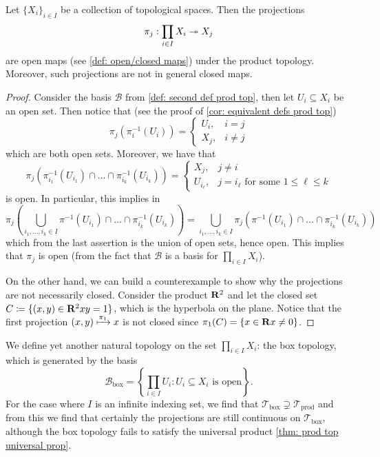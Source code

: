 \begin{lemma}
  Let \(\{X_i\}_{i \in I} \) be a collection of topological spaces. Then the
  projections
  \[
    \pi_j: \prod_{i \in I} X_i \twoheadrightarrow X_j
  \]
  are open maps (see \cref{def: open/closed maps}) under the product
  topology. Moreover, such projections are not in general closed maps.
\end{lemma}

\begin{proof}
  Consider the basis \(\mathcal B\) from \cref{def: second def prod top}, then
  let \(U_i \subseteq X_i\) be an open set. Then notice that (see the proof of
  \cref{cor: equivalent defs prod top})
  \[
    \pi_j(\pi_i^{-1}(U_i)) =
    \begin{cases}
      U_i, &i = j \\
      X_j, &i \neq j
    \end{cases}
  \]
  which are both open sets. Moreover, we have that
  \[
    \pi_j \left(\pi_{i_1}^{-1}(U_{i_1}) \cap \dots \cap \pi_{i_k}^{-1}(U_{i_k})
    \right) =
    \begin{cases}
      X_j,        & j \neq i \\
      U_{i_\ell}, & j = i_\ell \text{ for some } 1 \leq \ell \leq k
    \end{cases}
  \]
  is open. In particular, this implies in
  \[
    \pi_j \left( \bigcup_{i_1, \dots, i_k \in I} \pi^{-1}(U_{i_1}) \cap \dots
    \cap \pi_{i_k}^{-1}(U_{i_k}) \right)
    =
    \bigcup_{i_1, \dots, i_k \in I} \pi_j \left( \pi^{-1}(U_{i_1}) \cap \dots
    \cap \pi_{i_k}^{-1}(U_{i_k}) \right)
  \]
  which from the last assertion is the union of open sets, hence open. This
  implies that \(\pi_j\) is open (from the fact that \(\mathcal B\) is a basis
  for \(\prod_{i \in I} X_i\)).

  On the other hand, we can build a counterexample to show why the projections
  are not necessarily closed. Consider the product \(\mathbf{R}^2\) and let the
  closed set \(C \coloneq \{(x, y) \in \mathbf{R}^2 \relax x y = 1\}\), which is the
  hyperbola on the plane. Notice that the first projection \((x, y)
  \xmapsto{\pi_1} x\) is not closed since \(\pi_1(C) = \{x \in \mathbf{R} \relax x
  \neq 0\}\).
\end{proof}

\begin{definition}
  We define yet another natural topology on the set \(\prod_{i \in I} X_i\): the
  box topology, which is generated by the basis
  \[
    \mathcal B_\text{box} = \left\{\prod_{i \in I} U_i \colon U_i \subseteq X_i
    \text{ is open}\right\}.
  \]
  For the case where \(I\) is an infinite indexing set, we find that \(\mathcal
  T_\text{box} \supsetneq \mathcal T_\text{prod}\) and from this we find that
  certainly the projections are still continuous on \(\mathcal T_\text{box}\),
  although the box topology fails to satisfy the universal product \cref{thm:
  prod top universal prop}.
\end{definition}

